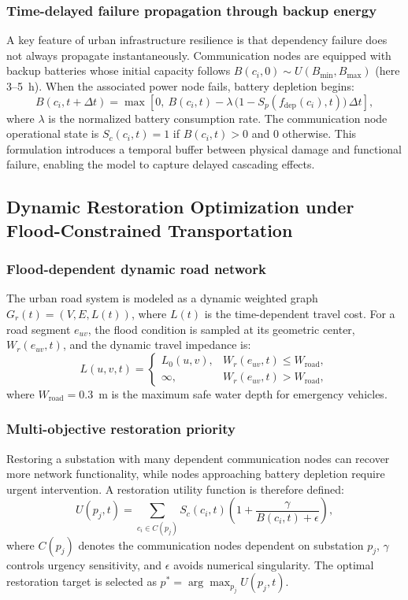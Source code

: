 \documentclass[preprint,12pt]{elsarticle}
\begin{document}
\subsubsection{Time-delayed failure propagation through backup energy}
A key feature of urban infrastructure resilience is that dependency failure
does not always propagate instantaneously. Communication nodes are equipped
with backup batteries whose initial capacity follows
$B(c_i,0) \sim U(B_{\min}, B_{\max})$ (here 3--5~h). When the associated power
node fails, battery depletion begins:
\begin{equation}\label{eq:battery}
B(c_i,t+\Delta t) =
\max\!\left[0,\ B(c_i,t) -
\lambda\,\bigl(1 - S_p(f_{\mathrm{dep}}(c_i),t)\bigr)\,\Delta t\right],
\end{equation}
where $\lambda$ is the normalized battery consumption rate. The communication
node operational state is $S_c(c_i,t) = 1$ if $B(c_i,t) > 0$ and $0$
otherwise. This formulation introduces a temporal buffer between physical
damage and functional failure, enabling the model to capture delayed cascading
effects.

\subsection{Dynamic Restoration Optimization under Flood-Constrained Transportation}
\subsubsection{Flood-dependent dynamic road network}
The urban road system is modeled as a dynamic weighted graph
$G_r(t) = (V, E, L(t))$, where $L(t)$ is the time-dependent travel cost. For a
road segment $e_{uv}$, the flood condition is sampled at its geometric
center, $W_r(e_{uv},t)$, and the dynamic travel impedance is:
\begin{equation}\label{eq:road}
L(u,v,t) =
\begin{cases}
L_0(u,v), & W_r(e_{uv},t) \le W_{\mathrm{road}},\\
\infty, & W_r(e_{uv},t) > W_{\mathrm{road}},
\end{cases}
\end{equation}
where $W_{\mathrm{road}} = 0.3$~m is the maximum safe water depth for
emergency vehicles.

\subsubsection{Multi-objective restoration priority}
Restoring a substation with many dependent communication nodes can recover
more network functionality, while nodes approaching battery depletion require
urgent intervention. A restoration utility function is therefore defined:
\begin{equation}\label{eq:utility}
U(p_j,t) = \sum_{c_i \in C(p_j)}
S_c(c_i,t)\left(1 + \frac{\gamma}{B(c_i,t)+\epsilon}\right),
\end{equation}
where $C(p_j)$ denotes the communication nodes dependent on substation $p_j$,
$\gamma$ controls urgency sensitivity, and $\epsilon$ avoids numerical
singularity. The optimal restoration target is selected as
$p^{*} = \arg\max_{p_j} U(p_j,t)$.
\end{document}
